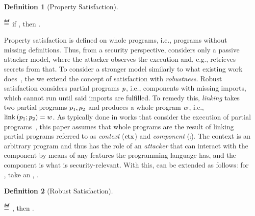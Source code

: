 \documentclass[dvipsnames,conference]{IEEEtran}
\theoremstyle{definition}
\newtheorem{definition}{Definition}[section]
\begin{document}
\begin{definition}[Property Satisfaction]\label{def:propsat}
$\;$ 

  \begin{nscenter}
    \bul{$\sat{\wholeprogvar}{\pi}$}
    $\isdef$
    if \iul{$\forall\runtimetermvar\ \trace,\progstepto{\wholeprogvar}{\runtimetermvar}{\trace}$},
    then \oul{$\trace\in\pi$}.
  \end{nscenter}
\end{definition}

Property satisfaction is defined on whole programs, i.e., programs without missing definitions.
Thus, from a security perspective,  considers only a passive attacker model, where the attacker observes the execution and, e.g., retrieves secrets from that.
To consider a stronger model similarly to what existing work does~\cite{abate2019jour,abate2021extacc,maffeis2008code-carrying,gordon2003authenticity,fournet2007authorization,bengtson2011refine,backes2014uniontyps,michael2023mswasm,swasey2017robust,sammler2019benefits}, the we extend the concept of satisfaction with {\em robustness}.
Robust satisfaction considers partial programs $\progvar$, i.e., components with missing imports, which cannot run until said imports are fulfilled.
To remedy this, {\em linking} takes two partial programs $\progvar[_{1}],\progvar[_{2}]$ and produces a whole program $\wholeprogvar$, i.e., $\link{\progvar[_{1}]}{\progvar[_{2}]}=\wholeprogvar$.
As typically done in works that consider the execution of partial programs~\cite{abate2019jour,devriese2018parametricity,patrignani2021rsc,korashy2021capableptrs,strydonck2019lincap,devriese2017modular,bowman2015noninterference,ahmed2011equivcps,patterson2017linkingtyps},
this paper assumes that whole programs are the result of linking partial programs referred to as {\em context} ($\ctx$) and {\em component} ($\comp$).
The context is an arbitrary program and thus has the role of an {\em attacker} that can interact with the component by means of any features the programming language has, and the component is what is security-relevant.
With this,  can be extended as follows: for , take an , .

\begin{definition}[Robust Satisfaction]\label{def:proprsat}
  $\;$ 

  \begin{nscenter}
  \bul{$\rsat{\progvar}{\pi}$}
  $\isdef$ , then \oul{$\sat{\wholeprogvar}{\pi}$}.
  \end{nscenter}
\end{definition}
\end{document}
